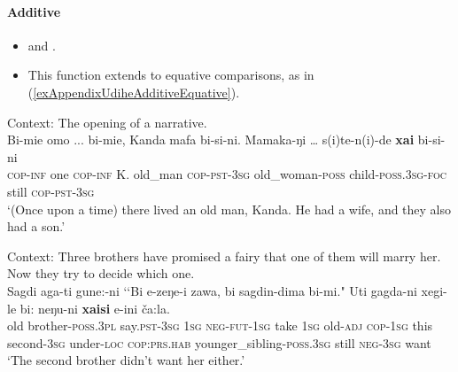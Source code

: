 \paragraph{Additive}\label{appendixUdiheAdditive}
\begin{itemize}
	\item \textcite[438]{NikolaevaTolskaya2001} and \textcite[78]{Schneider1936}. 
	\item This function extends to equative comparisons, as in (\ref{exAppendixUdiheAdditiveEquative}).
\end{itemize}
\begin{exe}
	\ex 
	Context: The opening of a narrative.\\
	\gll Bi-mie 	omo ... bi-mie, Kanda mafa  bi-si-ni. 	Mamaka-ŋi … s(i)te-n(i)-de \textbf{xai} bi-si-ni\\
	\textsc{cop}-\textsc{inf} one {} \textsc{cop}-\textsc{inf}  K. old\_man \textsc{cop}-\textsc{pst}-3\textsc{sg}  old\_woman-\textsc{poss} {} child-\textsc{poss}.3\textsc{sg}-\textsc{foc} still \textsc{cop}-\textsc{pst}-3\textsc{sg}\\
	\glt \lq (Once upon a time) there lived an old man, Kanda. He had a wife, and they also had a son.' \parencite[58, 63]{NikolaevaEtAl2002}
	
	\ex
	Context: Three brothers have promised a fairy that one of them will marry her. Now they try to decide which one.\\
	\gll Sagdi aga-ti gune:-ni \lq\lq{}Bi e-zeŋe-i zawa, bi sagdin-dima bi-mi." Uti gagda-ni xegi-le bi: neŋu-ni \textbf{xaisi} e-ini ča:la.\\
	old brother-\textsc{poss}.3\textsc{pl} say.\textsc{pst}-3\textsc{sg} \phantom{\lq\lq}1\textsc{sg} \textsc{neg}-\textsc{fut}-1\textsc{sg} take 1\textsc{sg} old-\textsc{adj} \textsc{cop}-1\textsc{sg} this second-3\textsc{sg} under-\textsc{loc} \textsc{cop}:\textsc{prs}.\textsc{hab} younger\_sibling-\textsc{poss}.3\textsc{sg} still \textsc{neg}-3\textsc{sg} want\\
	\glt \lq The second brother didn’t want her either.' \parencite[The alder tree girl]{NikolaevaEtAl2019}


\end{exe}
